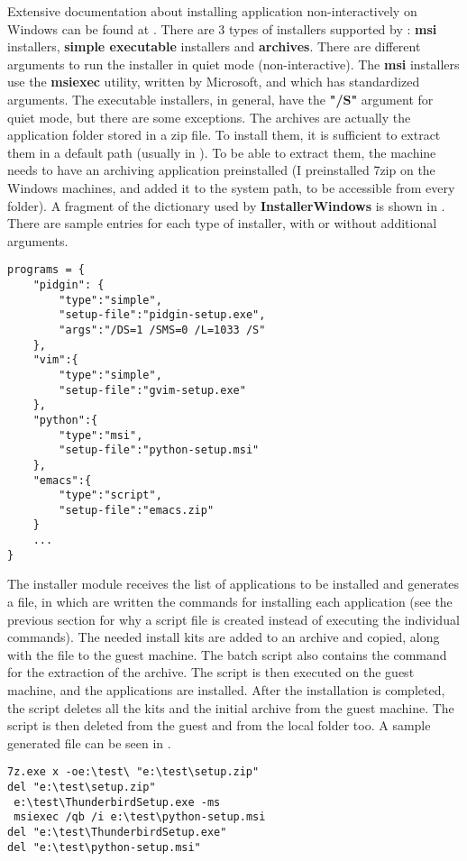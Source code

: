 Extensive documentation about installing application non-interactively on
Windows can be found at \cite{win-unattended}. There are 3 types of installers
supported by \project: \textbf{msi} installers, \textbf{simple executable}
installers and \textbf{archives}. There are different arguments to run the
installer in quiet mode (non-interactive). The \textbf{msi} installers use the
\textbf{msiexec} utility, written by Microsoft, and which has standardized
arguments. The executable installers, in general, have the \textbf{"/S"}
argument for quiet mode, but there are some exceptions.  The archives are
actually the application folder stored in a zip file. To install them, it is
sufficient to extract them in a default path (usually in
). To be able to extract them, the
machine needs to have an archiving application preinstalled (I preinstalled
7zip on the Windows machines, and added it to the system path, to be accessible
from every folder). A fragment of the dictionary used by
\textbf{InstallerWindows} is shown in
. There are sample entries for
each type of installer, with or without additional arguments.

\lstset{caption=Program details dictionary,label=lst:installer-win-dict}
\begin{lstlisting}
programs = {
	"pidgin": {
		"type":"simple",
		"setup-file":"pidgin-setup.exe",
		"args":"/DS=1 /SMS=0 /L=1033 /S"
	},
	"vim":{
		"type":"simple",
		"setup-file":"gvim-setup.exe"
	},
	"python":{
		"type":"msi",
		"setup-file":"python-setup.msi"
	},
	"emacs":{
		"type":"script",
		"setup-file":"emacs.zip"
	}
	...
}
\end{lstlisting}

The installer module receives the list of applications to be installed and
generates a  file, in which are written the commands for
installing each application (see the previous section for why a script file is
created instead of executing the individual commands). The needed install kits
are added to an archive and copied, along with the  file to the
guest machine. The batch script also contains the command for the extraction of
the archive. The script is then executed on the guest machine, and the
applications are installed. After the installation is completed, the script
deletes all the kits and the initial archive from the guest machine. The script
is then deleted from the guest and from the local folder too. A sample
generated  file can be seen in
.
 
\lstset{caption=Sample generated setup.bat,label=lst:setup-bat}
\begin{lstlisting}
7z.exe x -oe:\test\ "e:\test\setup.zip"
del "e:\test\setup.zip"
 e:\test\ThunderbirdSetup.exe -ms
 msiexec /qb /i e:\test\python-setup.msi 
del "e:\test\ThunderbirdSetup.exe"
del "e:\test\python-setup.msi"
\end{lstlisting}
